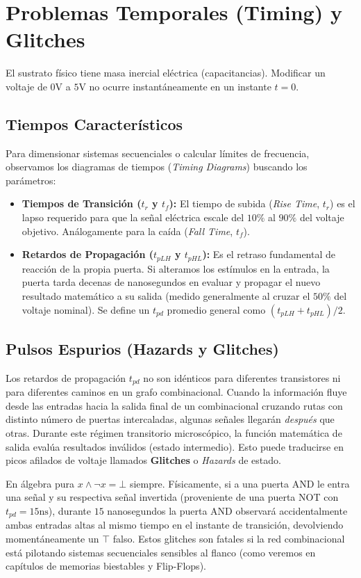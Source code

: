 \section{Problemas Temporales (Timing) y Glitches}

El sustrato físico tiene masa inercial eléctrica (capacitancias). Modificar un voltaje de $0\text{V}$ a $5\text{V}$ no ocurre instantáneamente en un instante $t=0.$

\subsection{Tiempos Característicos}
Para dimensionar sistemas secuenciales o calcular límites de frecuencia, observamos los diagramas de tiempos (\textit{Timing Diagrams}) buscando los parámetros:
\begin{itemize}
    \item \textbf{Tiempos de Transición ($t_r$ y $t_f$):} El tiempo de subida (\textit{Rise Time}, $t_r$) es el lapso requerido para que la señal eléctrica escale del $10\%$ al $90\%$ del voltaje objetivo. Análogamente para la caída (\textit{Fall Time}, $t_f$). 
    \item \textbf{Retardos de Propagación ($t_{pLH}$ y $t_{pHL}$):} Es el retraso fundamental de reacción de la propia puerta. Si alteramos los estímulos en la entrada, la puerta tarda decenas de nanosegundos en evaluar y propagar el nuevo resultado matemático a su salida (medido generalmente al cruzar el $50\%$ del voltaje nominal). Se define un $t_{pd}$ promedio general como $(t_{pLH} + t_{pHL}) / 2.$
\end{itemize}

\subsection{Pulsos Espurios (Hazards y Glitches)}
Los retardos de propagación $t_{pd}$ no son idénticos para diferentes transistores ni para diferentes caminos en un grafo combinacional.
Cuando la información fluye desde las entradas hacia la salida final de un combinacional cruzando rutas con distinto número de puertas intercaladas, algunas señales llegarán \textit{después} que otras.
Durante este régimen transitorio microscópico, la función matemática de salida evalúa resultados inválidos (estado intermedio). Esto puede traducirse en picos afilados de voltaje llamados \textbf{Glitches} o \textit{Hazards} de estado. 

En álgebra pura $x \wedge \neg x = \bot$ siempre. Físicamente, si a una puerta AND le entra una señal y su respectiva señal invertida (proveniente de una puerta NOT con $t_{pd} = 15\text{ns}$), durante $15$ nanosegundos la puerta AND observará accidentalmente ambas entradas altas al mismo tiempo en el instante de transición, devolviendo momentáneamente un $\top$ falso. Estos glitches son fatales si la red combinacional está pilotando sistemas secuenciales sensibles al flanco (como veremos en capítulos de memorias biestables y Flip-Flops).

